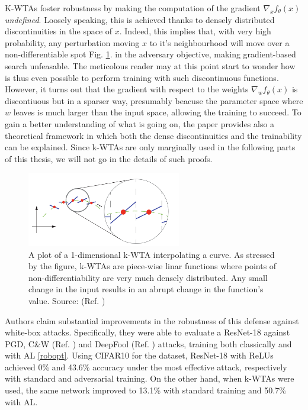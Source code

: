 \documentclass[LaM,binding=0.6cm]{./packages/sapthesis/sapthesis}
\begin{document}
    K-WTAs foster robustness by making the computation of the gradient $\nabla_x f_{\theta}(x)$ \textit{undefined}.
    Loosely speaking, this is achieved thanks to densely distributed discontinuities in the space of $x$. Indeed, this implies that,
    with very high probability, any perturbation moving $x$ to it's neighbourhood will move over a non-differentiable spot Fig. \ref{fig:kwta}.
    in the adversary objective, making gradient-based search unfeasable. The meticolous reader may at this point start to wonder
    how is thus even possible to perform training with such discontinuous functions. However, it turns out that the gradient 
    with respect to the weights $\nabla_w f_{\theta}(x)$ is discontiuous but in a sparser way, presumably beacuse the parameter 
    space where $w$ leaves is much larger than the input space, allowing the training to succeed. To gain a better understanding
    of what is going on, the paper provides also a theoretical framework in which both the dense discontinuities and the trainability 
    can be explained. Since k-WTAs are only marginally used in the following parts of this thesis, we will not go in the details
    of such proofs.

    \begin{figure}[h]
        \centering
        \includegraphics[width=0.6\textwidth]{kwta}
        \caption{A plot of a 1-dimensional k-WTA interpolating a curve. As stressed by the figure, k-WTAs are piece-wise linar functions where points of non-differentiability are 
        very much densely distributed. Any small change in the input results in an abrupt change in the function's value. Source: (Ref. )}
        \label{fig:kwta}
    \end{figure}
    
    Authors claim substantial improvements in the robustness of this defense against white-box attacks. Specifically, they were 
    able to evaluate a ResNet-18 against PGD, C\&W (Ref. ) and DeepFool (Ref. ) attacks, training both classically and with AL \ref{robopt}.
    Using CIFAR10 for the dataset, ResNet-18 with ReLUs achieved 0\% and 43.6\% accuracy under the most effective attack,
    respectively with standard and adversarial training. On the other hand, when k-WTAs were used, the same network improved to
    13.1\% with standard training and 50.7\% with AL.
\end{document}
